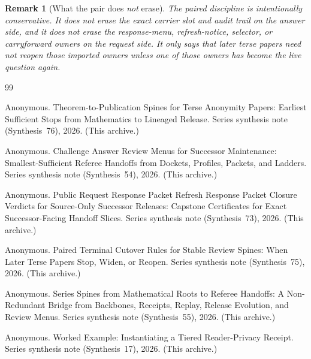 \documentclass[11pt]{article}
\newtheorem{remark}{Remark}
\begin{document}
\begin{remark}[What the pair does \emph{not} erase]
The paired discipline is intentionally conservative.
It does not erase the exact carrier slot and audit trail on the answer side, and it does not erase the response-menu, refresh-notice, selector, or carryforward owners on the request side.
It only says that later terse papers need not reopen those imported owners unless one of those owners has become the live question again.
\end{remark}

\begin{thebibliography}{99}\small

Anonymous.
\newblock Theorem-to-Publication Spines for Terse Anonymity Papers: Earliest Sufficient Stops from Mathematics to Lineaged Release.
\newblock Series synthesis note (Synthesis~76), 2026. (This archive.)

Anonymous.
\newblock Challenge Answer Review Menus for Successor Maintenance: Smallest-Sufficient Referee Handoffs from Dockets, Profiles, Packets, and Ladders.
\newblock Series synthesis note (Synthesis~54), 2026. (This archive.)

Anonymous.
\newblock Public Request Response Packet Refresh Response Packet Closure Verdicts for Source-Only Successor Releases: Capstone Certificates for Exact Successor-Facing Handoff Slices.
\newblock Series synthesis note (Synthesis~73), 2026. (This archive.)

Anonymous.
\newblock Paired Terminal Cutover Rules for Stable Review Spines: When Later Terse Papers Stop, Widen, or Reopen.
\newblock Series synthesis note (Synthesis~75), 2026. (This archive.)

Anonymous.
\newblock Series Spines from Mathematical Roots to Referee Handoffs: A Non-Redundant Bridge from Backbones, Receipts, Replay, Release Evolution, and Review Menus.
\newblock Series synthesis note (Synthesis~55), 2026. (This archive.)

Anonymous.
\newblock Worked Example: Instantiating a Tiered Reader-Privacy Receipt.
\newblock Series synthesis note (Synthesis~17), 2026. (This archive.)

\end{thebibliography}
\end{document}
